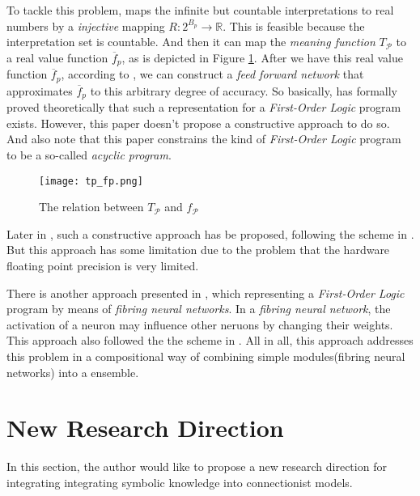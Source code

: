 \documentclass[letterpaper,10pt]{article}
\theoremstyle{definition}
\begin{document}
To tackle this problem, \cite{holldobler1999approximating} maps the infinite but
countable interpretations to real numbers by a \emph{injective} mapping
$R: 2^{B_p} \rightarrow \mathbb{R}$. This is feasible because the interpretation
set is countable. And then it can map the \emph{meaning function} $T_{\mathcal{P}}$ to a real
value function $\overline{f}_p$, as is depicted in Figure \ref{fig:tp_fp}. After
we have this real value function $\overline{f}_p$, according to
\cite{franklin1989approximate}, we can construct a \emph{feed forward network}
that approximates $\overline{f}_p$ to this arbitrary degree of accuracy.
So basically, \cite{holldobler1999approximating} has formally proved
theoretically that such a representation for a \emph{First-Order Logic} program
exists. However, this paper doesn't propose a constructive approach to do so. And
also note that this paper constrains the kind of \emph{First-Order Logic} program
to be a so-called \emph{acyclic program}. 

\begin{figure}[h]
\centering
\texttt{[image: tp\_fp.png]}
\caption{The relation between $T_{\mathcal{P}}$ and $f_{\mathcal{P}}$ \protect\footnotemark}
\label{fig:tp_fp}
\end{figure}


Later in \cite{bader2005integrating}, such a constructive approach has be proposed, following the scheme in \cite{holldobler1999approximating}. But this approach has some limitation due to the problem that the hardware floating point precision is very limited.

There is another approach presented in \cite{bader2005computing}, which representing a \emph{First-Order Logic} program by means of \emph{fibring neural networks}. In a \emph{fibring neural network}, the activation of a neuron may influence other neruons by changing their weights. This approach also followed the the scheme in \cite{holldobler1999approximating}. All in all, this approach addresses this problem in a compositional way of combining simple modules(fibring neural networks) into a ensemble.

\section{New Research Direction}\label{nrd_sec}

In this section, the author would like to propose a new research direction for integrating integrating symbolic knowledge into connectionist models.
\end{document}
